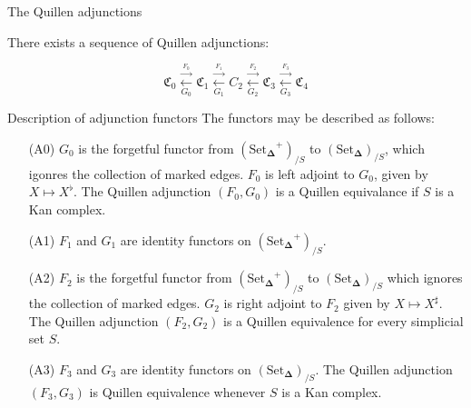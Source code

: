 \documentclass{beamer}[9pt]
\newcommand{\8}{\ensuremath{\infty}}
\newcommand{\C}{\ensuremath{\mathfrak{C}}}
\newcommand{\SSet}{\ensuremath{\text{Set}_{\boldsymbol{\Delta}}}}
\newcommand{\adj}[2]{\ensuremath{\overset{\overset{#1}{ \rightarrow}}{\underset{#2}{\leftarrow}}}}
\begin{document}
\begin{frame}{The Quillen adjunctions}
  \begin{theorem}
    There exists a sequence of Quillen adjunctions:

    $$
      \C_0 \adj{F_0}{G_0} \C_1 \adj{F_1}{G_1} C_2 \adj{F_2}{G_2} \C_3 \adj{F_3}{G_3} \C_4
    $$
  \end{theorem}
\end{frame}

\begin{frame}{Description of adjunction functors}
  The functors may be described as follows:
  \begin{itemize}
    \item[(A0)] $G_0$ is the forgetful functor from $(\SSet^+)_{/S}$ to $(\SSet)_{/S}$, which igonres the collection of marked edges. $F_0$ is left adjoint to $G_0$, given by $X \mapsto X^\flat$. The Quillen adjunction $(F_0, G_0)$ is a Quillen equivalance if $S$ is a Kan complex.
    \item[(A1)] $F_1$ and $G_1$ are identity functors on $(\SSet^+)_{/S}$.
    \item[(A2)]  $F_2$ is the forgetful functor from $(\SSet^+)_{/S}$ to $(\SSet)_{/S}$ which ignores the collection of marked edges. $G_2$ is right adjoint to $F_2$ given by $X \mapsto X^\sharp$. The Quillen adjunction $(F_2, G_2)$ is a Quillen equivalence for every simplicial set $S$.
    \item[(A3)]  $F_3$ and $G_3$ are identity functors on $(\SSet)_{/S}$. The Quillen adjunction $(F_3, G_3)$ is Quillen equivalence whenever $S$ is a Kan complex.
  \end{itemize}
\end{frame}
\end{document}
